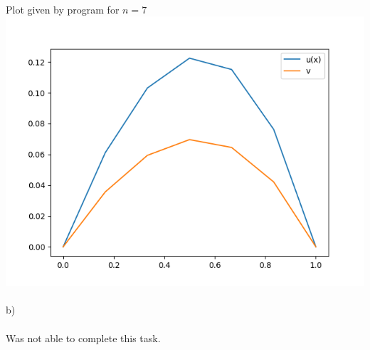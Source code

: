 \documentclass[12pt, letterpaper, twoside]{article}
\begin{document}
\newpage
\ \\
Plot given by program for $n=7$\\
\includegraphics[scale=0.8]{"Figure_1.png"}
\ \\
b)\\
\ \\
Was not able to complete this task.
\end{document}
